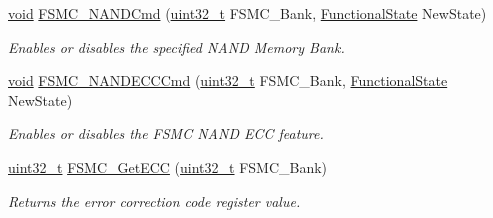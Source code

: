 \begin{DoxyCompactItemize}
\hyperlink{group___n_a_m_e_ga18028b8badbf1ea7e704ccac3c488e82}{void} \hyperlink{group___f_s_m_c___group2_ga33ec7c39ea4d42e92c72c6e517d8235c}{F\-S\-M\-C\-\_\-\-N\-A\-N\-D\-Cmd} (\hyperlink{stdint_8h_a435d1572bf3f880d55459d9805097f62}{uint32\-\_\-t} F\-S\-M\-C\-\_\-\-Bank, \hyperlink{group___exported__types_gac9a7e9a35d2513ec15c3b537aaa4fba1}{Functional\-State} New\-State)
\begin{DoxyCompactList}\small\item\em Enables or disables the specified N\-A\-N\-D Memory Bank. \end{DoxyCompactList}\item 
\hyperlink{group___n_a_m_e_ga18028b8badbf1ea7e704ccac3c488e82}{void} \hyperlink{group___f_s_m_c___group2_ga5800301fc39bbe998a18ebd9ff191cdc}{F\-S\-M\-C\-\_\-\-N\-A\-N\-D\-E\-C\-C\-Cmd} (\hyperlink{stdint_8h_a435d1572bf3f880d55459d9805097f62}{uint32\-\_\-t} F\-S\-M\-C\-\_\-\-Bank, \hyperlink{group___exported__types_gac9a7e9a35d2513ec15c3b537aaa4fba1}{Functional\-State} New\-State)
\begin{DoxyCompactList}\small\item\em Enables or disables the F\-S\-M\-C N\-A\-N\-D E\-C\-C feature. \end{DoxyCompactList}\item 
\hyperlink{stdint_8h_a435d1572bf3f880d55459d9805097f62}{uint32\-\_\-t} \hyperlink{group___f_s_m_c___group2_gaad6d4f5b5a41684ce053fea55bdb98d8}{F\-S\-M\-C\-\_\-\-Get\-E\-C\-C} (\hyperlink{stdint_8h_a435d1572bf3f880d55459d9805097f62}{uint32\-\_\-t} F\-S\-M\-C\-\_\-\-Bank)
\begin{DoxyCompactList}\small\item\em Returns the error correction code register value. \end{DoxyCompactList}\end{DoxyCompactItemize}


